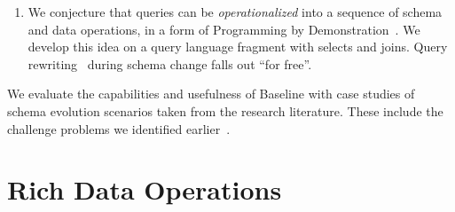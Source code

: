 \documentclass[english,submission]{programming}
\theoremstyle{definition}
\begin{document}
\begin{enumerate}
\item We conjecture that queries can be \textit{operationalized} into a sequence of schema and data operations, in a form of Programming by Demonstration~\cite{cypher93-pbd}. We develop this idea on a query language fragment with selects and joins.
Query rewriting~\cite{curino08, herrmann17} during schema change falls out ``for free''.



\end{enumerate}

We evaluate the capabilities and usefulness of Baseline with case studies of schema evolution scenarios taken from the research literature. These include the challenge problems we identified earlier~\cite{challenge-problems}.





\section{Rich Data Operations}\label{rich-data}
\end{document}
